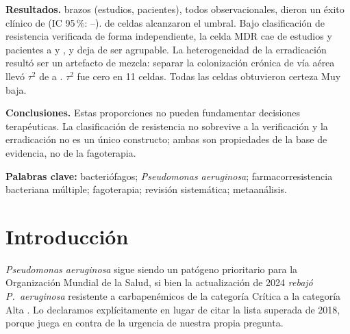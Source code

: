 \documentclass[12pt]{article}
\begin{document}
\textbf{Resultados.} \PrismaPooledArms brazos (\PrismaPooledStudies estudios,
\PatientsAnalysed pacientes), todos observacionales, dieron un éxito clínico de
\CsOverallEst (IC 95\,\%: \CsOverallLo--\CsOverallHi). \CellsPooled de
\CellsTotal celdas alcanzaron el umbral. Bajo clasificación de resistencia
verificada de forma independiente, la celda MDR cae de \ClassMDRStudiesAll
estudios y \ClassMDRPatientsAll pacientes a \ClassMDRStudiesVerified y
\ClassMDRPatientsVerified, y deja de ser agrupable. La heterogeneidad de la
erradicación resultó ser un artefacto de mezcla: separar la colonización crónica
de vía aérea llevó $\tau^2$ de \EradFullTau a \EradOtherTau. $\tau^2$ fue cero en
11 celdas. Todas las celdas obtuvieron certeza Muy baja.

\textbf{Conclusiones.} Estas proporciones no pueden fundamentar decisiones
terapéuticas. La clasificación de resistencia no sobrevive a la verificación y la
erradicación no es un único constructo; ambas son propiedades de la base de
evidencia, no de la fagoterapia.

\normalsize
\vspace{1em}
\noindent\textbf{Palabras clave:} bacteriófagos; \textit{Pseudomonas
aeruginosa}; farmacorresistencia bacteriana múltiple; fagoterapia; revisión
sistemática; metaanálisis.

\newpage
\setcounter{page}{1}

\section{Introducción}

\textit{Pseudomonas aeruginosa} sigue siendo un patógeno prioritario para la
Organización Mundial de la Salud, si bien la actualización de 2024
\emph{rebajó} \textit{P.\ aeruginosa} resistente a carbapenémicos de la
categoría Crítica a la categoría Alta \parencite{WHO2024_bppl,Tacconelli2018_who}.
Lo declaramos explícitamente en lugar de citar la lista superada de 2018, porque
juega en contra de la urgencia de nuestra propia pregunta.
\end{document}
